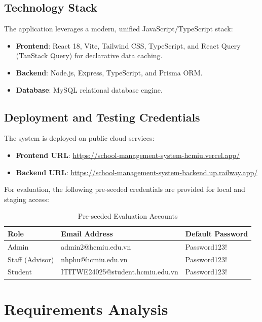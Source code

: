 \documentclass[12pt,a4paper]{report}
\begin{document}
\section{Technology Stack}
The application leverages a modern, unified JavaScript/TypeScript stack:
\begin{itemize}
    \item \textbf{Frontend}: React 18, Vite, Tailwind CSS, TypeScript, and React Query (TanStack Query) for declarative data caching.
    \item \textbf{Backend}: Node.js, Express, TypeScript, and Prisma ORM.
    \item \textbf{Database}: MySQL relational database engine.
\end{itemize}

\section{Deployment and Testing Credentials}
The system is deployed on public cloud services:
\begin{itemize}
    \item \textbf{Frontend URL}: \href{https://school-management-system-hcmiu.vercel.app/}{https://school-management-system-hcmiu.vercel.app/}
    \item \textbf{Backend URL}: \href{https://school-management-system-backend.up.railway.app/}{https://school-management-system-backend.up.railway.app/}
\end{itemize}
For evaluation, the following pre-seeded credentials are provided for local and staging access:
\begin{table}[h]
\centering
\begin{tabular}{lll}
\toprule
\textbf{Role} & \textbf{Email Address} & \textbf{Default Password} \\
\midrule
Admin & admin2@hcmiu.edu.vn & Password123! \\
Staff (Advisor) & nhphu@hcmiu.edu.vn & Password123! \\
Student & ITITWE24025@student.hcmiu.edu.vn & Password123! \\
\bottomrule
\end{tabular}
\caption{Pre-seeded Evaluation Accounts}
\end{table}

\chapter{Requirements Analysis}
\end{document}
